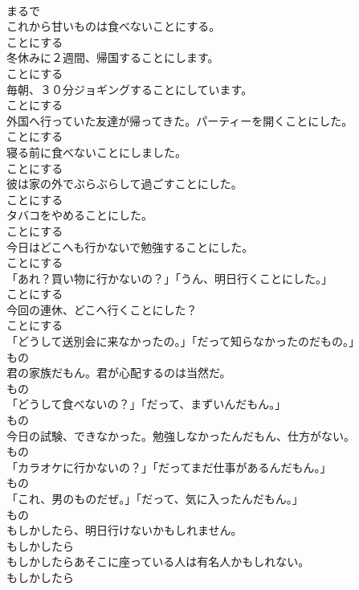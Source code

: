\documentclass[8pt]{extreport}
\begin{document}
\begin{CJK}{UTF8}{min}
\\	まるで
\\	これから甘いものは食べないことにする。	
\\	ことにする
\\	冬休みに２週間、帰国することにします。	
\\	ことにする
\\	毎朝、３０分ジョギングすることにしています。	
\\	ことにする
\\	外国へ行っていた友達が帰ってきた。パーティーを開くことにした。	
\\	ことにする
\\	寝る前に食べないことにしました。	
\\	ことにする
\\	彼は家の外でぶらぶらして過ごすことにした。	
\\	ことにする
\\	タバコをやめることにした。	
\\	ことにする
\\	今日はどこへも行かないで勉強することにした。	
\\	ことにする
\\	「あれ？買い物に行かないの？」「うん、明日行くことにした。」	
\\	ことにする
\\	今回の連休、どこへ行くことにした？	
\\	ことにする
\\	「どうして送別会に来なかったの。」「だって知らなかったのだもの。」	
\\	もの
\\	君の家族だもん。君が心配するのは当然だ。	
\\	もの
\\	「どうして食べないの？」「だって、まずいんだもん。」	
\\	もの
\\	今日の試験、できなかった。勉強しなかったんだもん、仕方がない。	
\\	もの
\\	「カラオケに行かないの？」「だってまだ仕事があるんだもん。」	
\\	もの
\\	「これ、男のものだぜ。」「だって、気に入ったんだもん。」	
\\	もの
\\	もしかしたら、明日行けないかもしれません。	
\\	もしかしたら
\\	もしかしたらあそこに座っている人は有名人かもしれない。	
\\	もしかしたら

\end{CJK}
\end{document}
